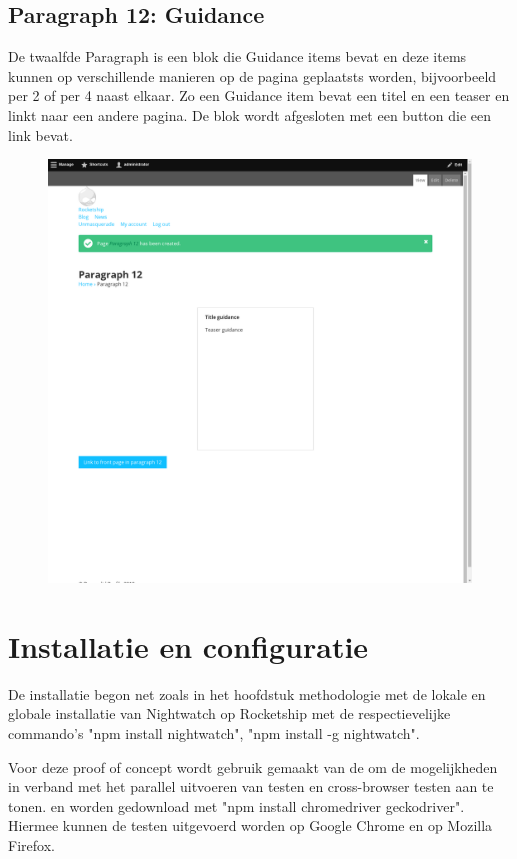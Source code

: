 \subsection{Paragraph 12: Guidance}
De twaalfde Paragraph is een blok die Guidance items bevat en deze items kunnen op verschillende manieren op de pagina geplaatsts worden, bijvoorbeeld per 2 of per 4 naast elkaar. Zo een Guidance item bevat een titel en een teaser en linkt naar een andere pagina. De blok wordt afgesloten met een button die een link bevat.
\begin{figure}[h]
\includegraphics[width=1\textwidth]{img/p012.png}
\end{figure}

\clearpage
\section{Installatie en configuratie}
De installatie begon net zoals in het hoofdstuk methodologie met de lokale en globale installatie van Nightwatch op Rocketship met de respectievelijke commando's "npm install nightwatch", "npm install -g nightwatch".

Voor deze proof of concept wordt gebruik gemaakt van de \textcite{SeleniumStandaloneServer} om de mogelijkheden in verband met het parallel uitvoeren van testen en cross-browser testen aan te tonen. \textcite{ChromeDriver2018} en \textcite{GeckoDriver} worden gedownload met "npm install chromedriver geckodriver". Hiermee kunnen de testen uitgevoerd worden op Google Chrome en op Mozilla Firefox.

